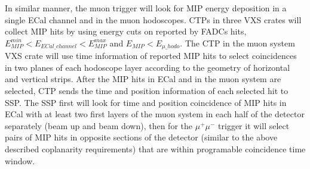 In similar manner, the muon trigger will look for MIP energy deposition in a single ECal channel and in the muon hodoscopes. CTPs in three VXS crates will collect MIP hits by using energy cuts on reported by FADCs hits, $E_{MIP}^{min}<E_{ECal\_channel}<E_{MIP}^{max}$ and $E_{MIP}<E_{\mu\_hodo}$. The CTP in the muon system VXS crate will use time information of reported MIP hits to select coincidences in two planes of each hodoscope layer according to the geometry of horizontal and vertical strips. After the MIP hits in ECal and in the muon system are selected, CTP sends the time and position information of each selected hit to SSP. The SSP first will look for time and position coincidence of MIP hits in ECal with at least two first layers of the muon system in each half of the detector separately (beam up and beam down), then for the $\mu^+\mu^-$ trigger it will select pairs of MIP hits in opposite sections of the detector (similar to the above described coplanarity requirements) that are within programable coincidence time window. 

